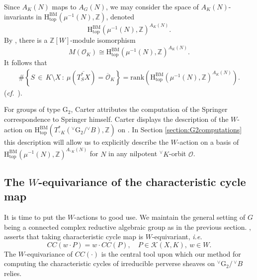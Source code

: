 \documentclass[a4paper, 11pt]{article}
\begin{document}
Since $A_K(N)$ maps to $A_G(N)$, we may consider the space of
$A_K(N)$-invariants in $\mathrm{H}_{\mathrm{top}}^{\mathrm{BM}}(\mu^{-1}(N),
\mathbb{Z})$, denoted 
\[
\mathrm{H}_{\mathrm{top}}^{\mathrm{BM}}(\mu^{-1}(N), \mathbb{Z})^{A_K(N)}.
\]
By \cite[Theorem 2.9.1]{Trapa2005}, there is a $\mathbb{Z}[W]$-module
isomorphism 
\begin{equation}\label{eq:Springer-representation2}
M(\mathcal{O}_K)\cong \mathrm{H}_{\mathrm{top}}^{\mathrm{BM}}(\mu^{-1}(N), \mathbb{Z})^{A_K(N)}.
\end{equation}
It follows that
\begin{align}\label{eq:cardinalite-dimension}
\#\left\{S\, \in\,  K\setminus X\, :\ 
 \mu(\overline{T_S^{\ast}X})=\overline{\mathcal{O}}_K 
 \right\}=\mathrm{rank}\left( \mathrm{H}_{\mathrm{top}}^{\mathrm{BM}}(\mu^{-1}(N),
 \mathbb{Z})^{A_K(N)} \right).   
\end{align}
(\emph{cf.}~\cite[Proposition 2.15 and Remark 2.16]{CNT}).

For groups of type $\mathrm{G}_{2}$, Carter attributes the computation of
the Springer correspondence to Springer himself.
Carter displays the description of the $W$-action on
$\mathrm{H}_{\mathrm{top}}^{\mathrm{BM}} 
(T_{{}^{\vee}K}^{\ast}({}^{\vee}\mathrm{G}_{2}/{}^{\vee}B),
\mathbb{Z})$ on \cite[page 427]{Carter85}. In Section
\ref{section:G2computations} this description will allow us to 
explicitly describe the $W$-action on a basis of 
$\mathrm{H}_{\mathrm{top}}^{\mathrm{BM}}(\mu^{-1}(N),
\mathbb{Z})^{A_{{}^{\vee}K}(N)}$ for $N$ in any nilpotent ${}^{\vee}K$-orbit
$\mathcal{O}$. 


\subsection{The $W$-equivariance of the characteristic cycle map}

It is time to put the $W$-actions to good use. We maintain the general
setting of $G$ being a connected complex reductive algebraic group as
in the previous section.
\cite[Theorem 
  1]{Tanisaki}, asserts that taking characteristic cycle map is
$W$-equivariant, \emph{i.e.}
\begin{equation}\label{eq:W-equivariant}
CC(w\cdot P)=w\cdot CC(P), \quad P\in \mathscr{K}(X,K), \ w\in W.
\end{equation}
The $W$-equivariance of $CC(\cdot)$ 
is the central tool upon which our method for computing the
characteristic cycles of irreducible perverse sheaves on
${}^{\vee}\mathrm{G}_{2}/ \,{^\vee}B$ relies.
\end{document}
